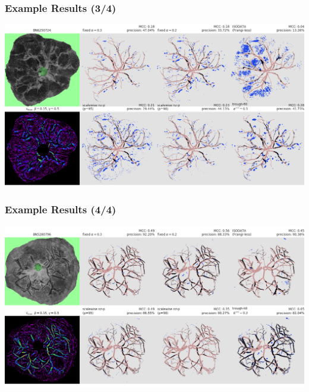 \documentclass[9pt]{beamer}
\begin{document}
\begin{frame}
\frametitle{Example Results (3/4)}
\includegraphics[width=\textwidth]{fig-BN6250724-semistrict-segdemo}
\end{frame}


\begin{frame}
\frametitle{Example Results (4/4)}
\includegraphics[width=\textwidth]{fig-BN5280796-semistrict-segdemo}
\end{frame}
%

\end{document}
